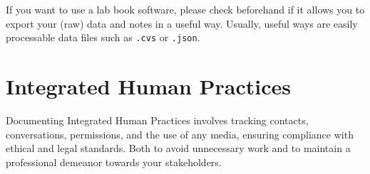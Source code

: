 \noindent If you want to use a lab book software, please check beforehand if it allows you to export your (raw) data and notes in a useful way.  Usually, useful ways are easily processable data files such as \texttt{.cvs} or \texttt{.json}. 

\section{Integrated Human Practices} \label{sec:ihp}  
Documenting Integrated Human Practices involves tracking contacts, conversations, permissions, and the use of any media, ensuring compliance with ethical and legal standards. \newline
Both to avoid unnecessary work and to maintain a professional demeanor towards your stakeholders.
